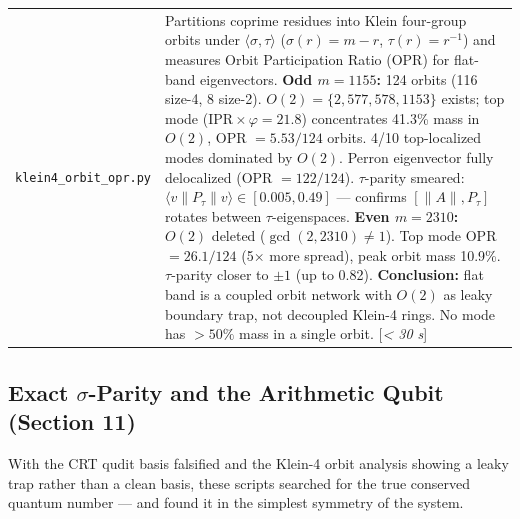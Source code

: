 \documentclass[11pt,letterpaper]{article}
\theoremstyle{definition}
\theoremstyle{remark}
\begin{document}
\begin{longtable}[]{@{}
  >{\raggedright\arraybackslash}p{}
  >{\raggedright\arraybackslash}p{}@{}}
\texttt{klein4\_orbit\_opr.py} & Partitions coprime residues into Klein four-group orbits under $\langle \sigma, \tau \rangle$ ($\sigma(r) = m{-}r$, $\tau(r) = r^{-1}$) and measures Orbit Participation Ratio (OPR) for flat-band eigenvectors. \textbf{Odd $m = 1155$:} 124 orbits (116 size-4, 8 size-2). $O(2) = \{2, 577, 578, 1153\}$ exists; top mode ($\text{IPR} \times \varphi = 21.8$) concentrates 41.3\% mass in $O(2)$, OPR $= 5.53/124$ orbits. 4/10 top-localized modes dominated by $O(2)$. Perron eigenvector fully delocalized (OPR $= 122/124$). $\tau$-parity smeared: $\langle v \| P_\tau \| v \rangle \in [0.005, 0.49]$ --- confirms $[\|A\|, P_\tau]$ rotates between $\tau$-eigenspaces. \textbf{Even $m = 2310$:} $O(2)$ deleted ($\gcd(2,2310) \neq 1$). Top mode OPR $= 26.1/124$ (5$\times$ more spread), peak orbit mass 10.9\%. $\tau$-parity closer to $\pm 1$ (up to 0.82). \textbf{Conclusion:} flat band is a coupled orbit network with $O(2)$ as leaky boundary trap, not decoupled Klein-4 rings. No mode has $> 50\%$ mass in a single orbit. [\textit{\textless{} 30 s}] \\
\end{longtable}

\subsection{Exact $\sigma$-Parity and the Arithmetic Qubit (Section 11)}\label{exact-sigma-parity-and-the-arithmetic-qubit-section-11}

With the CRT qudit basis falsified and the Klein-4 orbit analysis showing a leaky trap rather than a clean basis, these scripts searched for the true conserved quantum number --- and found it in the simplest symmetry of the system.
\end{document}
